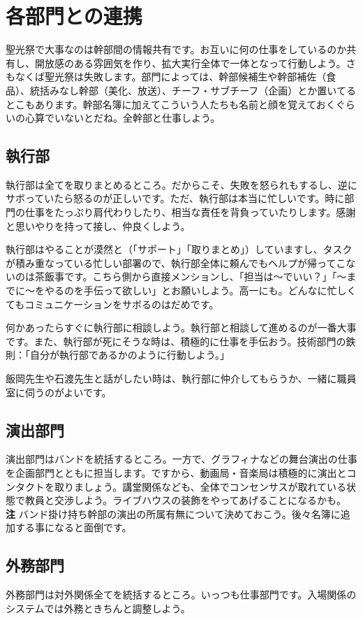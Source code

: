 \documentclass[dvipdfmx,jb5]{jreport}
\begin{document}
\section{各部門との連携}
聖光祭で大事なのは幹部間の情報共有です。お互いに何の仕事をしているのか共有し、開放感のある雰囲気を作り、拡大実行全体で一体となって行動しよう。さもなくば聖光祭は失敗します。部門によっては、幹部候補生や幹部補佐（食品）、統括みなし幹部（美化、放送）、チーフ・サブチーフ（企画）とか置いてるとこもあります。幹部名簿に加えてこういう人たちも名前と顔を覚えておくぐらいの心算でいないとだね。全幹部と仕事しよう。

\subsection{執行部}
執行部は全てを取りまとめるところ。だからこそ、失敗を怒られもするし、逆にサボっていたら怒るのが正しいです。ただ、執行部は本当に忙しいです。時に部門の仕事をたっぷり肩代わりしたり、相当な責任を背負っていたりします。感謝と思いやりを持って接し、仲良くしよう。

執行部はやることが漠然と（「サポート」「取りまとめ」）していますし、タスクが積み重なっている忙しい部署ので、執行部全体に頼んでもヘルプが帰ってこないのは茶飯事です。こちら側から直接メンションし、「担当は〜でいい？」「〜までに〜をやるのを手伝って欲しい」とお願いしよう。高一にも。どんなに忙しくてもコミュニケーションをサボるのはだめです。

何かあったらすぐに執行部に相談しよう。執行部と相談して進めるのが一番大事です。また、執行部が死にそうな時は、積極的に仕事を手伝おう。技術部門の鉄則：「自分が執行部であるかのように行動しよう。」

飯岡先生や石渡先生と話がしたい時は、執行部に仲介してもらうか、一緒に職員室に伺うのがよいです。

\subsection{演出部門}\label{sec:演出部門}
演出部門はバンドを統括するところ。一方で、グラフィナなどの舞台演出の仕事を企画部門とともに担当します。ですから、動画局・音楽局は積極的に演出とコンタクトを取りましょう。講堂関係なども、全体でコンセンサスが取れている状態で教員と交渉しよう。ライブハウスの装飾をやってあげることになるかも。\\
{\bf 注} バンド掛け持ち幹部の演出の所属有無について決めておこう。後々名簿に追加する事になると面倒です。

\subsection{外務部門}
外務部門は対外関係全てを統括するところ。いっつも仕事部門です。入場関係のシステムでは外務ときちんと調整しよう。
\end{document}
